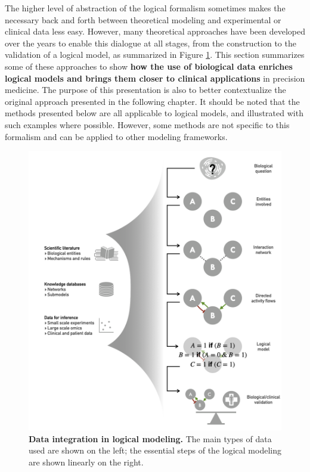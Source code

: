 \documentclass[a4paper,12pt,twoside,onecolumn,openright,final,oldfontcommands]{memoir}
\begin{document}
The higher level of abstraction of the logical formalism sometimes makes
the necessary back and forth between theoretical modeling and
experimental or clinical data less easy. However, many theoretical
approaches have been developed over the years to enable this dialogue at
all stages, from the construction to the validation of a logical model,
as summarized in Figure \ref{fig:logical-data}. This section summarizes
some of these approaches to show \textbf{how the use of biological data
enriches logical models and brings them closer to clinical applications}
in precision medicine. The purpose of this presentation is also to
better contextualize the original approach presented in the following
chapter. It should be noted that the methods presented below are all
applicable to logical models, and illustrated with such examples where
possible. However, some methods are not specific to this formalism and
can be applied to other modeling frameworks.

\begin{figure}

{\centering \includegraphics[width=0.9\linewidth]{fig/logical-data} 

}

\caption[Data integration in logical modeling]{\textbf{Data integration in logical
modeling.} The main types of data used are shown on the left; the
essential steps of the logical modeling are shown linearly on the right.}\label{fig:logical-data}
\end{figure}
\end{document}
